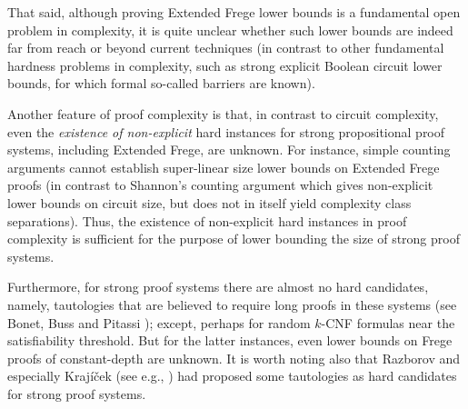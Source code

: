 \documentclass[12pt,reqno]{article}
\begin{document}
That said, although proving Extended Frege lower bounds is a fundamental open problem in complexity, it is quite unclear whether such lower bounds are indeed far from reach or beyond current techniques (in contrast to other fundamental hardness problems in complexity, such as strong explicit Boolean circuit lower bounds, for which formal so-called barriers are known).




Another feature of proof complexity is that, in contrast to circuit  complexity, even the \textit{existence of non-explicit }hard instances for strong propositional proof systems, including Extended Frege, are unknown. For instance, simple counting arguments cannot establish super-linear size lower bounds on Extended Frege proofs (in contrast to Shannon's counting argument which gives non-explicit lower bounds on circuit size, but does not in itself yield complexity class separations). Thus, the existence of non-explicit hard instances
in proof complexity is sufficient for the purpose of lower
bounding the size of strong proof systems.

Furthermore, for strong proof systems there are almost no hard candidates, namely, tautologies that are believed to require long proofs in these systems (see Bonet, Buss and Pitassi \cite{BBP95}); except, perhaps for random $k$-CNF formulas near the satisfiability threshold. But for the latter instances, even lower bounds on Frege proofs of constant-depth are unknown. It is worth noting also that Razborov \cite{Razb03} and especially Kraj\'{i}\v{c}ek (see e.g., \cite{Kra10-forcing}) had proposed some tautologies as hard candidates for strong proof systems.
\end{document}
